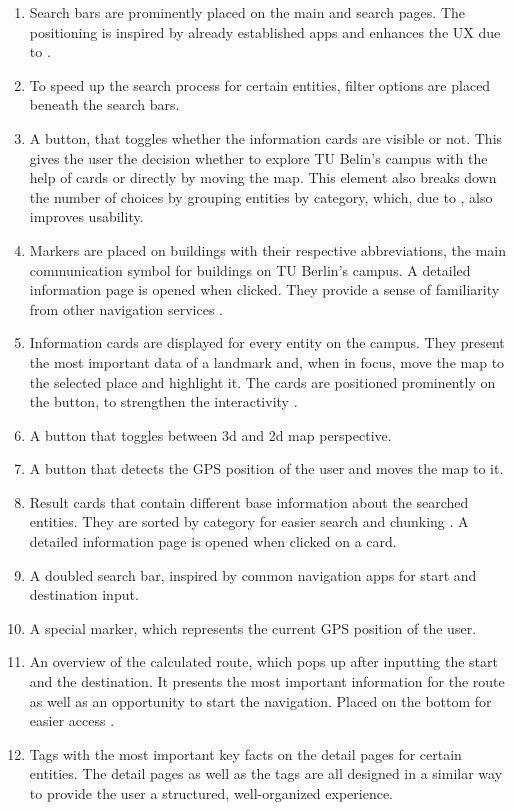 \begin{enumerate}
    \item Search bars are prominently placed on the main and search pages. The positioning is inspired by already established apps and enhances the UX due to \cite{jakobs_law}.
    \item To speed up the search process for certain entities, filter options are placed beneath the search bars.
    \item A button, that toggles whether the information cards are visible or not. This gives the user the decision whether to explore TU Belin's campus with the help of cards or directly by moving the map. This element also breaks down the number of choices by grouping entities by category, which, due to \cite{hicks_law}, also improves usability.
    \item Markers are placed on buildings with their respective abbreviations, the main communication symbol for buildings on TU Berlin's campus. A detailed information page is opened when clicked. They provide a sense of familiarity from other navigation services \cite{jakobs_law}.
    \item Information cards are displayed for every entity on the campus. They present the most important data of a landmark and, when in focus, move the map to the selected place and highlight it. The cards are positioned prominently on the button, to strengthen the interactivity \cite{fitts_law}.
    \item A button that toggles between 3d and 2d map perspective.
    \item A button that detects the GPS position of the user and moves the map to it.
    \item Result cards that contain different base information about the searched entities. They are sorted by category for easier search and chunking \cite{hicks_law}. A detailed information page is opened when clicked on a card.
    \item A doubled search bar, inspired by common navigation apps \cite{jakobs_law} for start and destination input.
    \item A special marker, which represents the current GPS position of the user.
    \item An overview of the calculated route, which pops up after inputting the start and the destination. It presents the most important information for the route as well as an opportunity to start the navigation. Placed on the bottom for easier access \cite{fitts_law}.
    \item Tags with the most important key facts on the detail pages for certain entities. The detail pages as well as the tags are all designed in a similar way to provide the user a structured, well-organized experience.

\end{enumerate}
